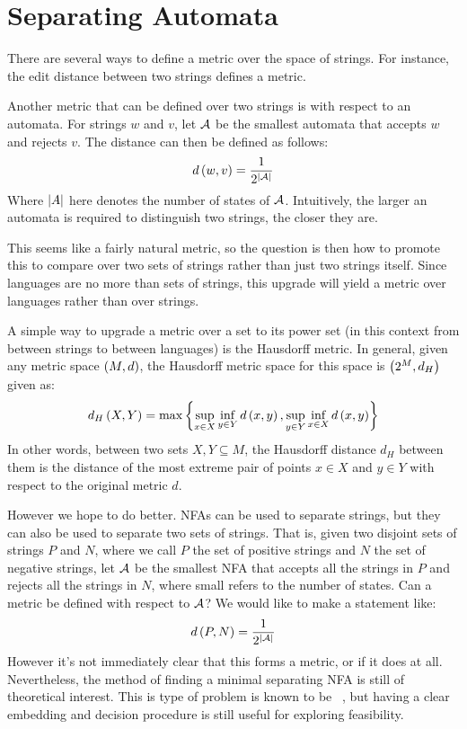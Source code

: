 
\section{Separating Automata}

There are several ways to define a metric over the space of strings.
For instance,
the edit distance between two strings defines a metric.

Another metric that can be defined over two strings is with respect to an
automata.
For strings \(w\) and \(v\),
let \(\mathcal{A}\) be the smallest automata that accepts \(w\) and rejects
\(v\).
The distance can then be defined as follows:
\begin{align*}
  d\left(w, v\right) = \frac{1}{2^{\left\lvert\mathcal{A}\right\rvert}}
\end{align*}
Where \(\left\lvert A\right\rvert\) here denotes the number of states of \(\mathcal{A}\).
Intuitively, the larger an automata is required to distinguish two strings,
the closer they are.


This seems like a fairly natural metric,
so the question is then how to promote this to
compare over two sets of strings rather than just two strings itself.
Since languages are no more than sets of strings,
this upgrade will yield a metric over languages rather than over strings.

A simple way to upgrade a metric over a set to its power set
(in this context from between strings to between languages)
is the Hausdorff metric.
In general, given any metric space \(\left(M, d\right)\),
the Hausdorff metric space for this space is \(\left(2^{M}, d_H\right)\)
given as:
\begin{align*}
  d_H\left(X, Y\right) =
    \max\left\{\sup_{x \in X} \inf_{y \in Y} d\left(x, y\right),
                \sup_{y \in Y} \inf_{x \in X} d\left(x, y\right)\right\}
\end{align*}
In other words, between two sets \(X, Y \subseteq M\),
the Hausdorff distance \(d_H\) between them is the distance of the most
extreme pair of points \(x \in X\) and \(y \in Y\)
with respect to the original metric \(d\).

However we hope to do better.
NFAs can be used to separate strings, but they can also be used to separate
two sets of strings.
That is, given two disjoint sets of strings \(P\) and \(N\),
where we call \(P\) the set of positive strings and \(N\) the set of
negative strings,
let \(\mathcal{A}\) be the smallest NFA that accepts all the strings in \(P\)
and rejects all the strings in \(N\),
where small refers to the number of states.
Can a metric be defined with respect to \(\mathcal{A}\)?
We would like to make a statement like:
\begin{align*}
  d\left(P, N\right) = \frac{1}{2^{\left\lvert\mathcal{A}\right\rvert}}
\end{align*}
However it's not immediately clear that this forms a metric,
or if it does at all.
Nevertheless, the method of finding a minimal separating NFA is
still of theoretical interest.
This is type of problem is known to be
~\cite{gold1978complexity},
but having a clear embedding and decision procedure is still useful
for exploring feasibility.


